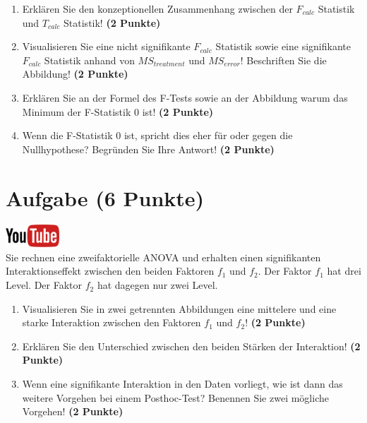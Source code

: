 \documentclass[a4paper, 10pt]{scrartcl}\usepackage[]{graphicx}\usepackage[]{xcolor}
\begin{document}
\begin{enumerate}
\item Erkl{\"a}ren Sie den konzeptionellen Zusammenhang zwischen der $F_{calc}$
  Statistik und $T_{calc}$ Statistik! \textbf{(2 Punkte)}
\item Visualisieren Sie eine nicht signifikante $F_{calc}$ Statistik sowie
  eine signifikante $F_{calc}$ Statistik anhand von $MS_{treatment}$ und
  $MS_{error}$! Beschriften Sie die Abbildung! \textbf{(2 Punkte)}
\item Erkl{\"a}ren Sie an der Formel des F-Tests sowie an der Abbildung warum
  das Minimum der F-Statistik 0 ist! \textbf{(2 Punkte)}
\item Wenn die F-Statistik 0 ist, spricht dies eher f{\"u}r oder gegen die
  Nullhypothese? Begr{\"u}nden Sie Ihre Antwort! \textbf{(2 Punkte)}
\end{enumerate}

 
\clearpage

\section{Aufgabe \hfill (6 Punkte)}

\hfill\href{https://youtu.be/2qG1Dws0MJo}{\includegraphics[width =
  2cm]{img/youtube}}\\[1Ex]


Sie rechnen eine zweifaktorielle ANOVA und erhalten einen signifikanten
Interaktionseffekt zwischen den beiden Faktoren $f_1$ und $f_2$. Der Faktor
$f_1$ hat drei Level. Der Faktor $f_2$ hat dagegen nur zwei Level.




\begin{enumerate}
\item Visualisieren Sie in zwei getrennten Abbildungen eine
  mittelere und eine starke Interaktion zwischen
  den Faktoren $f_1$ und $f_2$! \textbf{(2 Punkte)}
\item Erkl{\"a}ren Sie den Unterschied zwischen den beiden St{\"a}rken der Interaktion!
  \textbf{(2 Punkte)}
\item Wenn eine signifikante Interaktion in den Daten vorliegt, wie ist
  dann das weitere Vorgehen bei einem Posthoc-Test? Benennen Sie zwei
  m{\"o}gliche Vorgehen!
  \textbf{(2 Punkte)}
\end{enumerate}
\end{document}

